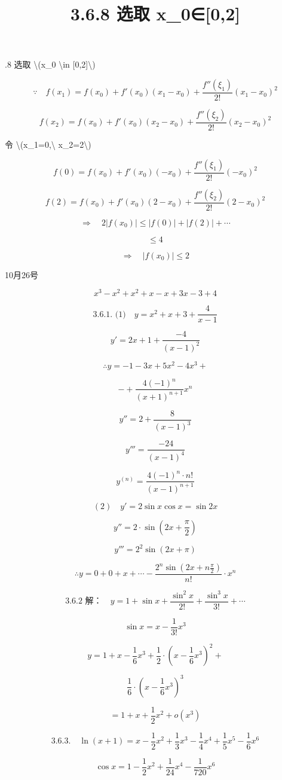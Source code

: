 \documentclass[UTF8,fontset=windows]{ctexart}
\title{3.6.8 选取 x\_0∈[0,2]}
\begin{document}
.8 选取 \textbackslash{}(x\_0 \textbackslash{}in [0,2]\textbackslash{})

\[
\because\quad f(x_1)=f(x_0)+f'(x_0)(x_1-x_0)+\frac{f''(\xi_1)}{2!}(x_1-x_0)^2
\]

\[
f(x_2)=f(x_0)+f'(x_0)(x_2-x_0)+\frac{f''(\xi_2)}{2!}(x_2-x_0)^2
\]

令 \textbackslash{}(x\_1=0,\textbackslash{} x\_2=2\textbackslash{})

\[
f(0)=f(x_0)+f'(x_0)(-x_0)+\frac{f''(\xi_1)}{2!}(-x_0)^2
\]

\[
f(2)=f(x_0)+f'(x_0)(2-x_0)+\frac{f''(\xi_2)}{2!}(2-x_0)^2
\]

\[
\Rightarrow\quad 2|f(x_0)|\le |f(0)|+|f(2)|+\cdots
\]

\[
\le 4
\]

\[
\Rightarrow\quad |f(x_0)|\le 2
\]

\newpage

10月26号

\[
x^3-x^2+x^2+x-x+3x-3+4
\]

\[
\text{3.6.1. (1)}\quad y=x^2+x+3+\frac{4}{x-1}
\]

\[
y'=2x+1+\frac{-4}{(x-1)^2}
\]

\[
\therefore y=-1-3x+5x^2-4x^3+
\]

\[
-+\frac{4(-1)^n}{(x+1)^{n+1}}x^n
\]

\[
y''=2+\frac{8}{(x-1)^3}
\]

\[
y'''=\frac{-24}{(x-1)^4}
\]

\[
y^{(n)}=\frac{4(-1)^n\cdot n!}{(x-1)^{n+1}}
\]

\[
(2)\quad y'=2\sin x\cos x=\sin 2x
\]

\[
y''=2\cdot\sin\left(2x+\frac{\pi}{2}\right)
\]

\[
y'''=2^2\sin(2x+\pi)
\]

\[
\therefore y=0+0+x+\cdots-\frac{2^n\sin(2x+n\frac{\pi}{2})}{n!}\cdot x^n
\]

\[
\text{3.6.2 解：}\quad y=1+\sin x+\frac{\sin^2 x}{2!}+\frac{\sin^3 x}{3!}+\cdots
\]

\[
\sin x=x-\frac{1}{3!}x^3
\]

\[
y=1+x-\frac{1}{6}x^3+\frac{1}{2}\cdot\left(x-\frac{1}{6}x^3\right)^2+
\]

\[
\frac{1}{6}\cdot\left(x-\frac{1}{6}x^3\right)^3
\]

\[
=1+x+\frac{1}{2}x^2+o(x^3)
\]

\[
\text{3.6.3.}\quad \ln(x+1)=x-\frac{1}{2}x^2+\frac{1}{3}x^3-\frac{1}{4}x^4+\frac{1}{5}x^5-\frac{1}{6}x^6
\]

\[
\cos x=1-\frac{1}{2}x^2+\frac{1}{24}x^4-\frac{1}{720}x^6
\]
\end{document}
